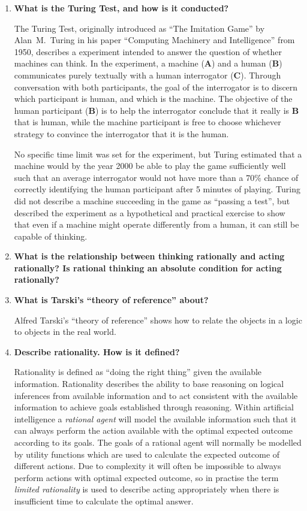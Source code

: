 \begin{enumerate}
\item \textbf{What is the Turing Test, and how is it conducted?}

The Turing Test, originally introduced as ``The Imitation Game'' by Alan~M.~Turing in his paper ``Computing Machinery and Intelligence'' from 1950, describes a experiment intended to answer the question of whether machines can think. In the experiment, a machine (\textbf{A}) and a human (\textbf{B}) communicates purely textually with a human interrogator (\textbf{C}). Through conversation with both participants, the goal of the interrogator is to discern which participant is human, and which is the machine. The objective of the human participant (\textbf{B}) is to help the interrogator conclude that it really is \textbf{B} that is human, while the machine participant is free to choose whichever strategy to convince the interrogator that it is the human.

No specific time limit was set for the experiment, but Turing estimated that a machine would by the year 2000 be able to play the game sufficiently well such that an average interrogator would not have more than a 70\% chance of correctly identifying the human participant after 5 minutes of playing. Turing did not describe a machine succeeding in the game as ``passing a test'', but described the experiment as a hypothetical and practical exercise to show that even if a machine might operate differently from a human, it can still be capable of thinking.

\item \textbf{What is the relationship between thinking rationally and acting rationally? Is rational thinking an absolute condition for acting rationally?}

\item \textbf{What is Tarski's ``theory of reference'' about?}

Alfred Tarski's ``theory of reference'' shows how to relate the objects in a logic to objects in the real world.

\item \textbf{Describe rationality. How is it defined?}

Rationality is defined as ``doing the right thing'' given the available information. Rationality describes the ability to base reasoning on logical inferences from available information and to act consistent with the available information to achieve goals established through reasoning. Within artificial intelligence a \textit{rational agent} will model the available information such that it can always perform the action available with the optimal expected outcome according to its goals. The goals of a rational agent will normally be modelled by utility functions which are used to calculate the expected outcome of different actions. Due to complexity it will often be impossible to always perform actions with optimal expected outcome, so in practise the term \textit{limited rationality} is used to describe acting appropriately when there is insufficient time to calculate the optimal answer.


\end{enumerate}
